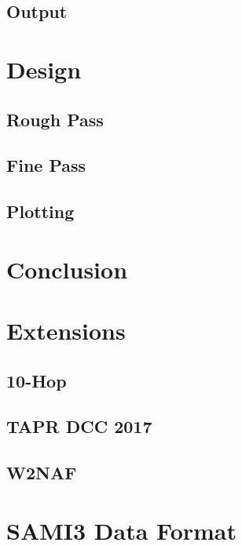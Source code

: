 \documentclass[12pt,letterpaper]{article}
\begin{document}
\subsection{Output}
\label{sec:usage:output}

%
%
\section{Design}
\label{sec:design}

\subsection{Rough Pass}
\label{sec:design:rough}

\subsection{Fine Pass}
\label{sec:design:fine}

\subsection{Plotting}
\label{sec:design:plotting}

%
%
\section{Conclusion}
\label{sec:conclusion}

%
%
\newpage
\renewcommand{\bibname}{References}



\newpage
\begin{appendices}

  \section{Extensions}
  \label{sec:extensions}

  \subsection{10-Hop}
  \label{sec:extensions:10hop}

  \subsection{TAPR DCC 2017}
  \label{sec:extensions:dcc2017}

  \subsection{W2NAF}
  \label{sec:extensions:w2naf}

  \section{SAMI3 Data Format}
  \label{sec:sami3_df}

\end{appendices}
\end{document}
